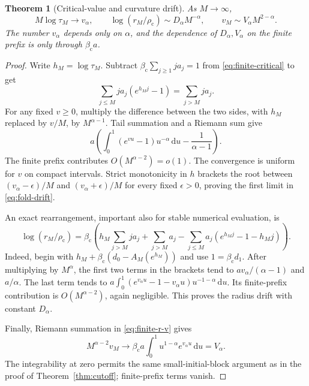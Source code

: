 \documentclass[11pt,a4paper]{article}
\numberwithin{equation}{section}
\newtheorem{theorem}{Theorem}[section]
\theoremstyle{definition}
\theoremstyle{remark}
\newcommand{\dd}{\,\mathrm d}
\newcommand{\bc}{\beta_{\mathrm c}}
\newcommand{\rhoc}{\rho_{\mathrm c}}
\begin{document}
\begin{theorem}[Critical-value and curvature drift]
\label{thm:fold-drift}
As $M\to\infty$,
\begin{equation}\label{eq:fold-drift}
 M\log\tau_M\longrightarrow v_\alpha,\qquad
 \log(r_M/\rhoc)\sim D_\alpha M^{-\alpha},\qquad
 v_M\sim V_\alpha M^{2-\alpha}.
\end{equation}
The number $v_\alpha$ depends only on $\alpha$, and the dependence of
$D_\alpha,V_\alpha$ on the finite prefix is only through $\bc a$.
\end{theorem}
\begin{proof}
Write $h_M=\log\tau_M$. Subtract
$\bc\sum_{j\ge1}j a_j=1$ from \eqref{eq:finite-critical} to get
\begin{equation}\label{eq:h-root}
 \sum_{j\le M}j a_j(e^{h_Mj}-1)=\sum_{j>M}j a_j.
\end{equation}
For any fixed $v\ge0$, multiply the difference between the two sides,
with $h_M$ replaced by $v/M$, by $M^{\alpha-1}$. Tail summation and a
Riemann sum give
\[
 a\left(\int_0^1(e^{vu}-1)u^{-\alpha}\dd u
                         -\frac1{\alpha-1}\right).
\]
The finite prefix contributes $O(M^{\alpha-2})=o(1)$. The convergence is
uniform for $v$ on compact intervals. Strict monotonicity in $h$ brackets
the root between $(v_\alpha-\epsilon)/M$ and
$(v_\alpha+\epsilon)/M$ for every fixed $\epsilon>0$, proving the first
limit in \eqref{eq:fold-drift}.

An exact rearrangement, important also for stable numerical evaluation,
is
\begin{equation}\label{eq:radius-rearrangement}
 \log(r_M/\rhoc)=\bc\left(
       h_M\sum_{j>M}j a_j+\sum_{j>M}a_j
       -\sum_{j\le M}a_j(e^{h_Mj}-1-h_Mj)\right).
\end{equation}
Indeed, begin with
$h_M+\bc(d_0-A_M(e^{h_M}))$ and use $1=\bc d_1$.
After multiplying by $M^\alpha$, the first two terms in the brackets
tend to $a v_\alpha/(\alpha-1)$ and $a/\alpha$.
The last term tends to
$a\int_0^1(e^{v_\alpha u}-1-v_\alpha u)u^{-1-\alpha}\dd u$.
Its finite-prefix contribution is $O(M^{\alpha-2})$, again negligible.
This proves the radius drift with constant $D_\alpha$.

Finally, Riemann summation in \eqref{eq:finite-r-v} gives
\[
 M^{\alpha-2}v_M
   \longrightarrow\bc a\int_0^1u^{1-\alpha}e^{v_\alpha u}\dd u
   =V_\alpha.
\]
The integrability at zero permits the same small-initial-block argument
as in the proof of Theorem~\ref{thm:cutoff}; finite-prefix terms vanish.
\end{proof}
\end{document}
